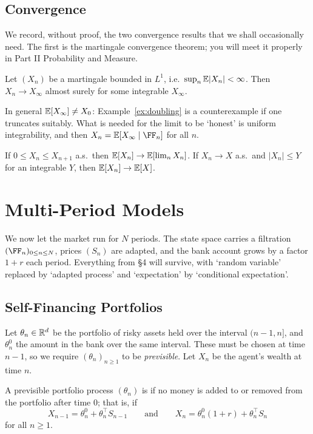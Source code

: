\documentclass[a4paper]{scrartcl}
\begin{document}
\subsection{Convergence}

We record, without proof, the two convergence results that we shall occasionally need. The first is the martingale convergence theorem; you will meet it properly in Part II Probability and Measure.

\begin{theorem}
	Let $(X_n)$ be a martingale bounded in $L^1$, i.e.\ $\sup_n\mathbb{E}|X_n| < \infty$. Then $X_n \to X_\infty$ almost surely for some integrable $X_\infty$.
\end{theorem}

In general $\mathbb{E}[X_\infty] \neq X_0$: Example~\ref{ex:doubling} is a counterexample if one truncates suitably. What is needed for the limit to be `honest' is uniform integrability, and then $X_n = \EE[X_\infty\mid\FF_n]$ for all $n$.

\begin{theorem}
	If $0\leq X_n \leq X_{n+1}$ a.s.\ then $\mathbb{E}[X_n]\to\mathbb{E}[\lim_n X_n]$. If $X_n \to X$ a.s.\ and $|X_n|\leq Y$ for an integrable $Y$, then $\mathbb{E}[X_n]\to\mathbb{E}[X]$.
\end{theorem}

\section{Multi-Period Models}

We now let the market run for $N$ periods. The state space carries a filtration $(\FF_n)_{0\leq n\leq N}$, prices $(S_n)$ are adapted, and the bank account grows by a factor $1+r$ each period. Everything from \S4 will survive, with `random variable' replaced by `adapted process' and `expectation' by `conditional expectation'.

\subsection{Self-Financing Portfolios}

Let $\theta_n \in \mathbb{R}^d$ be the portfolio of risky assets held over the interval $(n-1,n]$, and $\theta_n^0$ the amount in the bank over the same interval. These must be chosen at time $n-1$, so we require $(\theta_n)_{n\geq1}$ to be \emph{previsible}. Let $X_n$ be the agent's wealth at time $n$.

\begin{definition}
	A previsible portfolio process $(\theta_n)$ is  if no money is added to or removed from the portfolio after time $0$; that is, if
	$$
	X_{n-1} = \theta_n^0 + \theta_n^\top S_{n-1} \qquad \text{and}\qquad X_n = \theta_n^0(1+r) + \theta_n^\top S_n
	$$
	for all $n \geq 1$.
\end{definition}
\end{document}

